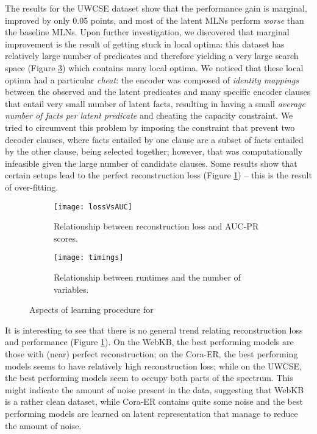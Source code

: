 The results for the UWCSE dataset show that the performance gain is marginal, improved by only 0.05 points, and most of the latent MLNs perform \textit{worse} than the baseline MLNs.
Upon further investigation, we discovered that marginal improvement is the result of  getting stuck in local optima: this dataset has relatively large number of predicates  and therefore yielding a very large search space (Figure \ref{fig:timings}) which contains many local optima.
We noticed that these local optima had a particular \textit{cheat}: the encoder was composed of \textit{identity mappings} between the observed and the latent predicates and many specific encoder clauses that entail very small number of latent facts, resulting in having a small \textit{average number of facts per latent predicate} and cheating the capacity constraint.
We tried to circumvent this problem by imposing the constraint that prevent two decoder clauses, where facts entailed by one clause are a subset of facts entailed by the other clause, being selected together; however, that was computationally infeasible given the large number of candidate clauses.
Some results show that certain setups lead to the perfect reconstruction loss (Figure \ref{fig:lossvsaucpr}) -- this is the result of over-fitting.




\begin{figure}[t!]
	\centering
	\begin{subfigure}[t]{0.48\linewidth}
		\centering
		\texttt{[image: lossVsAUC]}
		\caption{Relationship between reconstruction loss and AUC-PR scores. \label{fig:lossvsaucpr}}
	\end{subfigure}
	\hspace{.2em}
	\begin{subfigure}[t]{0.48\linewidth}
		\centering
		\texttt{[image: timings]}

		\caption{Relationship between runtimes and the number of variables.\label{fig:timings}}
	\end{subfigure}
	\caption{Aspects of learning procedure for }
\end{figure}



It is interesting to see that there is no general trend relating reconstruction loss and performance (Figure \ref{fig:lossvsaucpr}).
On the WebKB, the best performing models are those with (near) perfect reconstruction; on the Cora-ER, the best performing models seems to have relatively high reconstruction loss; while on the UWCSE, the best performing models seem to occupy both parts of the spectrum.
This might indicate the amount of noise present in the data, suggesting that WebKB is a rather clean dataset, while Cora-ER contains quite some noise and the best performing models are learned on latent representation that manage to reduce the amount of noise.


